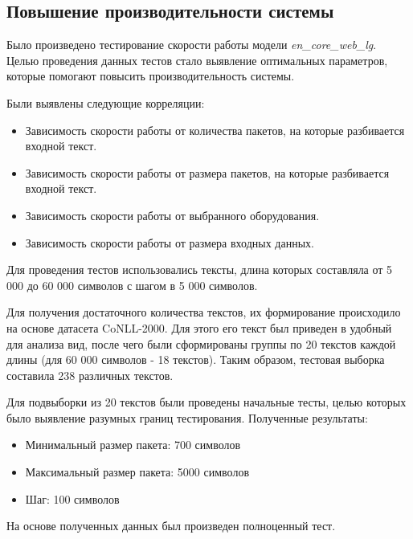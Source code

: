 \subsection{Повышение производительности системы}
Было произведено тестирование скорости работы модели \emph{en\_core\_web\_lg}. Целью проведения данных тестов стало выявление оптимальных параметров, которые помогают повысить производительность системы.

Были выявлены следующие корреляции:
\begin{itemize}
  \item Зависимость скорости работы от количества пакетов, на которые разбивается входной текст.
  \item Зависимость скорости работы от размера пакетов, на которые разбивается входной текст.
  \item Зависимость скорости работы от выбранного оборудования.
    \item Зависимость скорости работы от размера входных данных.
\end{itemize}

Для проведения тестов использовались тексты, длина которых составляла от 5 000 до 60 000 символов с шагом в 5 000 символов.

Для получения достаточного количества текстов, их формирование происходило на основе датасета CoNLL-2000. Для этого его текст был приведен в удобный для анализа вид, после чего были сформированы группы по 20 текстов каждой длины (для 60 000 символов - 18 текстов).
Таким образом, тестовая выборка составила 238 различных текстов.

Для подвыборки из 20 текстов были проведены начальные тесты, целью которых было выявление разумных границ тестирования.
Полученные  результаты:
\begin{itemize}
  \item Минимальный размер пакета: 700 символов
  \item Максимальный размер пакета: 5000 символов
  \item Шаг: 100 символов
\end{itemize}

На основе полученных данных был произведен полноценный тест. 

